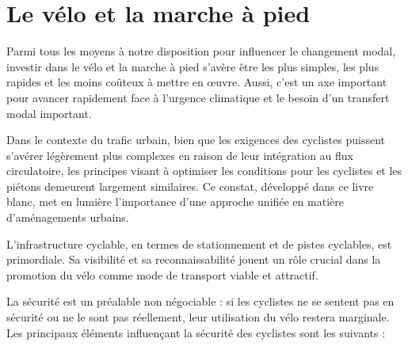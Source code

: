 \chapter{Le vélo et la marche à pied}

Parmi tous les moyens à notre disposition pour influencer le
changement modal, investir dans le vélo et la marche à pied s'avère
être les plus simples, les plus rapides et les moins coûteux à mettre
en œuvre. Aussi, c'est un axe important pour avancer rapidement face à
l'urgence climatique et le besoin d’un transfert modal important.

Dans le contexte du trafic urbain, bien que les exigences des
cyclistes puissent s'avérer légèrement plus complexes en raison de
leur intégration au flux circulatoire, les principes visant à
optimiser les conditions pour les cyclistes et les piétons demeurent
largement similaires. Ce constat, développé dans ce livre blanc, met
en lumière l'importance d'une approche unifiée en matière
d'aménagements urbains.

L'infrastructure cyclable, en termes de stationnement et de pistes
cyclables, est primordiale. Sa visibilité et sa reconnaissabilité
jouent un rôle crucial dans la promotion du vélo comme mode de
transport viable et attractif.

La sécurité est un préalable non négociable : si les cyclistes ne se
sentent pas en sécurité ou ne le sont pas réellement, leur utilisation
du vélo restera marginale. Les principaux éléments influençant la
sécurité des cyclistes sont les suivants :

